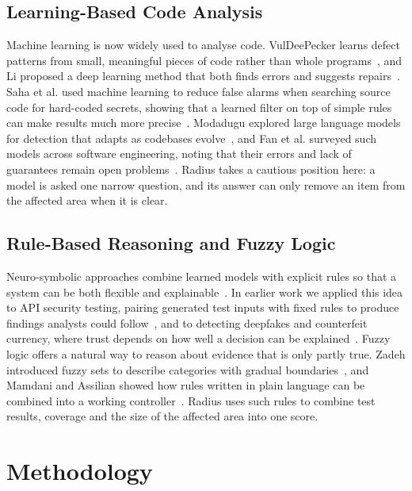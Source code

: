\documentclass[conference]{IEEEtran}
\begin{document}
\subsection{Learning-Based Code Analysis}
Machine learning is now widely used to analyse code. VulDeePecker learns defect patterns from small, meaningful pieces of code rather than whole programs~\cite{li2018vuldeepecker}, and Li proposed a deep learning method that both finds errors and suggests repairs~\cite{10498527}. Saha et al. used machine learning to reduce false alarms when searching source code for hard-coded secrets, showing that a learned filter on top of simple rules can make results much more precise~\cite{9027350}. Modadugu explored large language models for detection that adapts as codebases evolve~\cite{modadugu2025}, and Fan et al. surveyed such models across software engineering, noting that their errors and lack of guarantees remain open problems~\cite{fan2023llmse}. Radius takes a cautious position here: a model is asked one narrow question, and its answer can only remove an item from the affected area when it is clear.

\subsection{Rule-Based Reasoning and Fuzzy Logic}
Neuro-symbolic approaches combine learned models with explicit rules so that a system can be both flexible and explainable~\cite{garcez2023neurosymbolic}. In earlier work we applied this idea to API security testing, pairing generated test inputs with fixed rules to produce findings analysts could follow~\cite{11631384}, and to detecting deepfakes and counterfeit currency, where trust depends on how well a decision can be explained~\cite{11320726}. Fuzzy logic offers a natural way to reason about evidence that is only partly true. Zadeh introduced fuzzy sets to describe categories with gradual boundaries~\cite{zadeh1965fuzzy}, and Mamdani and Assilian showed how rules written in plain language can be combined into a working controller~\cite{mamdani1975fuzzy}. Radius uses such rules to combine test results, coverage and the size of the affected area into one score.

\section{Methodology}
\label{sec:method}
\end{document}
